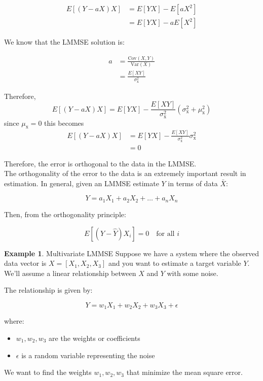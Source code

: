 \documentclass[12pt]{book}
\theoremstyle{definition}
\newtheorem{exmp}{Example}[chapter]
\begin{document}
\[
\begin{aligned}
    E[(Y-aX)X] & = E[YX] - E[aX^2]\\
                & = E[YX] -a E[X^2]
\end{aligned}
\]

We know that the LMMSE solution is:

\[
\begin{aligned}
a &= \frac{\text{Cov}(X, Y)}{\text{Var}(X)} \\
    & = \frac{E[XY]}{\sigma_\mathrm{x}^2}
\end{aligned}
\]

Therefore,
\[
E[(Y-aX)X] = E[YX] - \frac{E[XY]}{\sigma_\mathrm{x}^2}(\sigma_\mathrm{x}^2 + \mu_\mathrm{x}^2)
\]
since \(\mu_\mathrm{x}=0\) this becomes
\[
\begin{aligned}
    E[(Y-aX)X] & = E[YX] - \frac{E[XY]}{\sigma_\mathrm{x}^2}\sigma_\mathrm{x}^2 \\
                & = 0
\end{aligned}
\]

Therefore, the error is orthogonal to the data in the LMMSE.\\

The orthogonality of the error to the data is an extremely important result in estimation. In general, given an LMMSE estimate \( Y \) in terms of data \( \bar{X} \):

\[
Y = a_1 X_1 + a_2 X_2 + \ldots + a_n X_n
\]

Then, from the orthogonality principle:

\[
{E}[(Y - \hat{Y}) X_i] = 0 \quad \text{for all } i
\]



\begin{tcolorbox}
\begin{exmp}{Multivariate LMMSE}
Suppose we have a system where the observed data vector is \(X = [X_1, X_2, X_3]\) and you want to estimate a target variable \(Y\). We'll assume a linear relationship between \(X\) and \(Y\) with some noise.

The relationship is given by:

\[ Y = w_1 X_1 + w_2 X_2 + w_3 X_3 + \epsilon \]

where:
\begin{itemize}
    \item \(w_1, w_2, w_3\) are the weights or coefficients
    \item \(\epsilon\) is a random variable representing the noise
\end{itemize}


We want to find the weights \(w_1, w_2, w_3\) that minimize the mean square error.


\end{exmp}
\end{tcolorbox}
\end{document}
